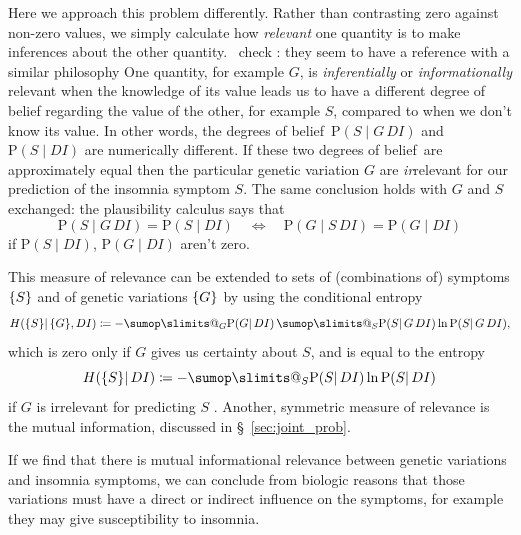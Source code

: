\documentclass[\ifafour a4paper,12pt,\else a5paper,10pt,\fi%
onecolumn,oneside,article,%
british%
]{memoir}
\makeatletter
\theoremstyle{remark}
\theoremstyle{innote}
\def\sum{\DOTSI\sumop\slimits@}
\newcommand*{\citep}{\parencites}
\newcommand*{\defd}{\coloneqq}
\DeclarePairedDelimiter\set{\{}{\}}
\newcommand*{\p}{\mathrm{P}}%
\renewcommand*{\|}{\mathpunct{|}}
\newcommand*{\sect}{\S}%
\newcommand*{\chap}{ch.}%
\newcommand*{\puzzle}{\maltese}
\newcommand{\mynote}[1]{ {\color{notecolour}\puzzle\ #1}}
\newcommand*{\dobs}{degrees of belief}
\newcommand*{\yD}{D}
\newcommand*{\yG}{G}
\newcommand*{\yS}{S}
\newcommand*{\yI}{I}
\newcommand*{\sH}{H}
\makeatother
\begin{document}
Here we approach this problem differently. Rather than contrasting zero
against non-zero values, we simply calculate how \emph{relevant} one
quantity is to make inferences about the other quantity.\mynote{check
  \citep{stephensetal2009}: they seem to have a reference with a similar
  philosophy} One quantity, for example $\yG$, is \emph{inferentially} or
\emph{informationally} relevant when the knowledge of its value leads us to
have a different degree of belief regarding the value of the other, for
example $\yS$, compared to when we don't know its value. In other words,
the \dobs\ $\p(\yS \| \yG \,\yD \yI)$ and $\p(\yS \| \yD \yI)$ are
numerically different. If these two \dobs\ are approximately equal
then the particular genetic variation $\yG$ are \emph{ir}relevant for our
prediction of the insomnia symptom $\yS$. The same conclusion holds with
$\yG$ and $\yS$ exchanged: the plausibility calculus says that
\begin{equation}
  \label{eq:exchange_irrelevance}
  \p(\yS \| \yG \,\yD \yI) = \p(\yS \| \yD \yI)
  \quad\Longleftrightarrow\quad
    \p(\yG \| \yS \,\yD \yI) = \p(\yG \| \yD \yI)
\end{equation}
if $\p(\yS \| \yD \yI)$, $\p(\yG \| \yD \yI)$ aren't zero.

This measure of relevance can be extended to sets of (combinations of)
symptoms $\set{\yS}$ and of genetic variations $\set{\yG}$ by using the
conditional entropy
\citep{shannon1948,kelly1956}[\sect~14.7]{pressetal1988_r2007}[\chap~2]{coveretal1991_r2006}
\begin{equation}
  \label{eq:conditional_entropy}
  \sH(\set{\yS} \| \set{\yG}, \yD\yI) \defd
  -\sum_{\yG} \p(\yG \| \yD\yI)\,
  \sum_{\yS} \p(\yS \|\yG\,\yD\yI) \ln\p(\yS \|\yG\,\yD\yI),
\end{equation}
which is zero only if $\yG$ gives us certainty about $\yS$, and is equal to
the entropy 
\begin{equation}
  \sH(\set{\yS} \| \yD\yI) \defd
-\sum_{\yS}\p(\yS \|\yD\yI) \ln\p(\yS \|\yD\yI)
  \label{eq:entropy_G}
\end{equation}
if $\yG$ is irrelevant for predicting $\yS$
\citep[\sect~14.7]{pressetal1988_r2007}[\chap~2]{coveretal1991_r2006}.
Another, symmetric measure of relevance is the mutual information,
discussed in \sect~\ref{sec:joint_prob}.

If we find that there is mutual informational relevance between genetic
variations and insomnia symptoms, we can conclude from biologic reasons
that those variations must have a direct or indirect influence on the
symptoms, for example they may give susceptibility to insomnia.
\end{document}
